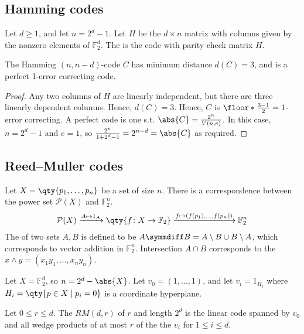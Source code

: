 \subsection{Hamming codes}

\begin{definition}
    Let $d \geq 1$, and let $n = 2^d - 1$.
    Let $H$ be the $d \times n$ matrix with columns given by the nonzero elements of $\mathbb F_2^d$.
    The  is the code with parity check matrix $H$.
\end{definition}

\begin{lemma}
    The Hamming $(n, n-d)$-code $C$ has minimum distance $d(C) = 3$, and is a perfect 1-error correcting code.
\end{lemma}

\begin{proof}
    Any two columns of $H$ are linearly independent, but there are three linearly dependent columns.
    Hence, $d(C) = 3$.
    Hence, $C$ is $\floor*{\frac{3-1}{2}} = 1$-error correcting.
    A perfect code is one s.t. $\abs{C} = \frac{2^n}{V(n,e)}$.
    In this case, $n = 2^d - 1$ and $e = 1$, so $\frac{2^n}{1 + 2^d - 1} = 2^{n-d} = \abs{C}$ as required.
\end{proof}

\subsection{Reed--Muller codes}
Let $X = \qty{p_1, \dots, p_n}$ be a set of size $n$.
There is a correspondence between the power set $\mathcal P(X)$ and $\mathbb F_2^n$.
\begin{align*}
    \mathcal P(X) \xrightarrow{A \mapsto 1_A} \qty{f \colon X \to \mathbb F_2} \xrightarrow{f \mapsto (f(p_1), \dots, f(p_n))} \mathbb F_2^n
\end{align*}
The  of two sets $A, B$ is defined to be $A \symmdiff B = A\setminus B \cup B \setminus A$, which corresponds to vector addition in $\mathbb F_2^n$.
Intersection $A \cap B$ corresponds to the  $x \wedge y = (x_1 y_1, \dots, x_n y_n)$.

Let $X = \mathbb F_2^d$, so $n = 2^d - \abs{X}$.
Let $v_0 = (1, \dots, 1)$, and let $v_i = 1_{H_i}$ where $H_i = \qty{p \in X \mid p_i = 0}$ is a coordinate hyperplane.

\begin{definition}
    Let $0 \leq r \leq d$.
    The  $RM(d,r)$ of  $r$ and length $2^d$ is the linear code spanned by $v_0$ and all wedge products of at most $r$ of the the $v_i$ for $1 \leq i \leq d$.
\end{definition}

